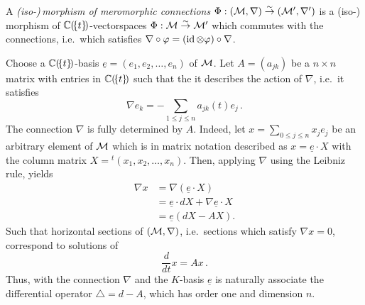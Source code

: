\begin{defn}
  A \emph{(iso-)\,morphism of meromorphic connections}
  $\Phi:(\mathcal{M},\nabla)\overset{\sim}\to(\mathcal{M}',\nabla')$ is a (iso-)\,morphism of
  $\mathbb{C}(\!\{t\}\!)$-vectorspaces $\Phi:\mathcal{M}\overset{\sim}\to\mathcal{M}'$ which commutes
  with the connections, i.e.\ which satisfies
  $\nabla\circ\varphi = (\operatorname{id}\otimes\varphi)\circ\nabla$.
\end{defn}
Choose a $\mathbb{C}(\!\{t\}\!)$-basis $\underline{e}=(e_1,e_2,\dots,e_n)$ of $\mathcal{M}$.
Let $A=(a_{jk})$ be a $n\times n$ matrix with entries in $\mathbb{C}(\!\{t\}\!)$
such that the it describes the action of $\nabla$, i.e.\ it satisfies
\[
  \nabla e_k
  =
  -\sum_{1\leq j\leq n} a_{jk}(t)e_j \,.
\]
The connection $\nabla$ is fully determined by $A$. Indeed, let
$x=\sum_{0\leq j\leq n}x_je_j$ be an arbitrary element of $\mathcal{M}$ which is in
matrix notation described as $x=\underline{e}\cdot X$ with the column matrix
$X={}^t\!(x_1,x_2 ,\dots,x_n)$.
Then, applying $\nabla$ using the Leibniz rule, yields
\begin{align*}
  \nabla x&=\nabla\left(\underline{e}\cdot X\right)
  \\&=\underline{e} \cdot dX + \nabla \underline{e} \cdot X
  \\&=\underline{e}\left(dX-AX\right).
\end{align*}
Such that horizontal sections of $(\mathcal{M},\nabla)$, i.e.\ sections which satisfy
$\nabla x=0$, correspond to solutions of
\begin{equation}\label{eq:ode}
  \frac{d}{dt}x=Ax \,.
\end{equation}
Thus, with the connection $\nabla$ and the $K$-basis $\underline{e}$ is
naturally associate the differential operator $\triangle=d-A$, which has order
one and dimension $n$.

